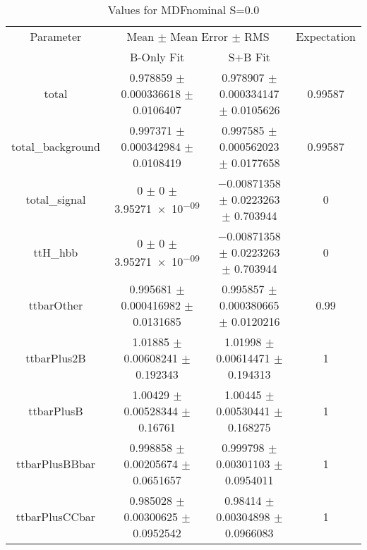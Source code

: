 \begin{table}
\centering
\caption{Values for MDFnominal S=0.0}
\begin{tabular}{cccc}
\toprule
Parameter & \multicolumn{2}{c}{Mean $\pm$ Mean Error $\pm$ RMS} & Expectation\\
 & B-Only Fit & S+B Fit & \\
\midrule
total & \num{0.978859} $\pm$ \num{0.000336618} $\pm$ \num{0.0106407} & \num{0.978907} $\pm$ \num{0.000334147} $\pm$ \num{0.0105626} & \num{0.99587}\\
total\_background & \num{0.997371} $\pm$ \num{0.000342984} $\pm$ \num{0.0108419} & \num{0.997585} $\pm$ \num{0.000562023} $\pm$ \num{0.0177658} & \num{0.99587}\\
total\_signal & \num{0} $\pm$ \num{0} $\pm$ \num{3.95271e-09} & \num{-0.00871358} $\pm$ \num{0.0223263} $\pm$ \num{0.703944} & \num{0}\\
ttH\_hbb & \num{0} $\pm$ \num{0} $\pm$ \num{3.95271e-09} & \num{-0.00871358} $\pm$ \num{0.0223263} $\pm$ \num{0.703944} & \num{0}\\
ttbarOther & \num{0.995681} $\pm$ \num{0.000416982} $\pm$ \num{0.0131685} & \num{0.995857} $\pm$ \num{0.000380665} $\pm$ \num{0.0120216} & \num{0.99}\\
ttbarPlus2B & \num{1.01885} $\pm$ \num{0.00608241} $\pm$ \num{0.192343} & \num{1.01998} $\pm$ \num{0.00614471} $\pm$ \num{0.194313} & \num{1}\\
ttbarPlusB & \num{1.00429} $\pm$ \num{0.00528344} $\pm$ \num{0.16761} & \num{1.00445} $\pm$ \num{0.00530441} $\pm$ \num{0.168275} & \num{1}\\
ttbarPlusBBbar & \num{0.998858} $\pm$ \num{0.00205674} $\pm$ \num{0.0651657} & \num{0.999798} $\pm$ \num{0.00301103} $\pm$ \num{0.0954011} & \num{1}\\
ttbarPlusCCbar & \num{0.985028} $\pm$ \num{0.00300625} $\pm$ \num{0.0952542} & \num{0.98414} $\pm$ \num{0.00304898} $\pm$ \num{0.0966083} & \num{1}\\
\bottomrule
\end{tabular}
\end{table}